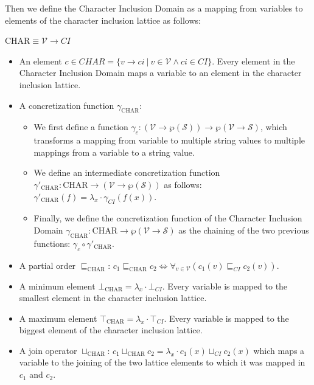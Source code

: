 \documentclass[10pt]{report}
\begin{document}
	Then we define the Character Inclusion Domain as a mapping from variables to elements of the character inclusion lattice as follows: 
\begin{center}
	$ \mathrm{CHAR} \equiv \mathcal{V} \longrightarrow CI $
\end{center} 
\begin{itemize}
	\item An element $ c \in CHAR = \lbrace v \longrightarrow ci\ \vert\  v \in \mathcal{V} \wedge ci \in CI \rbrace $. Every element in the Character Inclusion Domain maps a variable to an element in the character inclusion lattice. 
	\item A concretization function $ \gamma_{\mathrm{CHAR}} $: 
		\begin{itemize} 
		\item We first define a function $ \gamma_{c}: (\mathcal{V} \rightarrow \wp(\mathcal{S})) \longrightarrow \wp(\mathcal{V} \rightarrow \mathcal{S}) $, which transforms a mapping from variable to multiple string values to multiple mappings from a variable to a string value. 
		\item We define an intermediate concretization function $ \gamma'_{\mathrm{CHAR}}: \mathrm{CHAR} \longrightarrow (\mathcal{V} \rightarrow \wp(\mathcal{S})) $ as follows: $ \gamma'_{\mathrm{CHAR}}(f) = \lambda_{x}\cdot \gamma_{CI}(f(x)) $. 
		\item Finally, we define the concretization function of the Character Inclusion Domain $ \gamma_{\mathrm{CHAR}}: \mathrm{CHAR} \longrightarrow \wp(\mathcal{V} \rightarrow \mathcal{S}) $ as the chaining of the two previous functions: $ \gamma_{c} \circ \gamma'_{\mathrm{CHAR}}$. 
	\end{itemize}

	\item A partial order $ \sqsubseteq_{\mathrm{CHAR}} $: $ c_{1} \sqsubseteq_{\mathrm{CHAR}} c_{2} \Longleftrightarrow \forall_{v \in \mathcal{V}} (c_{1}(v) \sqsubseteq_{CI} c_{2}(v))$.
	\item A minimum element $ \bot_{\mathrm{CHAR}} = \lambda_{x} \cdot \bot_{CI}$. Every variable is mapped to the smallest element in the character inclusion lattice.  
	\item A maximum element $ \top_{\mathrm{CHAR}} = \lambda_{x} \cdot \top_{CI} $. Every variable is mapped to the biggest element of the character inclusion lattice. 
	\item A join operator $ \sqcup_{\mathrm{CHAR}} $: $ c_{1} \sqcup_{\mathrm{CHAR}} c_{2} = \lambda_{x}\cdot c_{1}(x) \sqcup_{CI} c_{2}(x) $ which maps a variable to the joining of the two lattice elements to which it was mapped in $ c_{1} $ and $ c_{2} $.
	 

\end{itemize}
\end{document}
